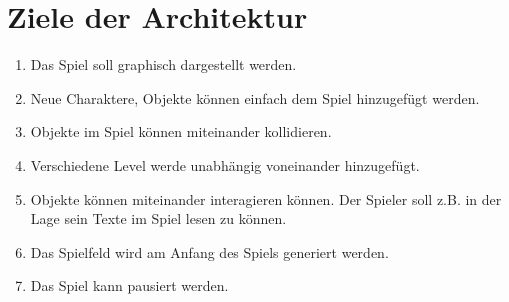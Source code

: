 \chapter{Ziele der Architektur}


\begin{enumerate}
    \item Das Spiel soll graphisch dargestellt werden.
    \item Neue Charaktere, Objekte können einfach dem Spiel hinzugefügt werden.
    \item Objekte im Spiel können miteinander kollidieren.
    \item Verschiedene Level werde unabhängig voneinander hinzugefügt.
    \item Objekte können miteinander interagieren können. 
        Der Spieler soll z.B. in der Lage sein Texte im Spiel lesen zu können.
    \item Das Spielfeld wird am Anfang des Spiels generiert werden.
    \item Das Spiel kann pausiert werden.
\end{enumerate}
        
